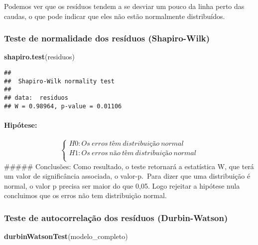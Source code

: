 \documentclass[
]{article}
\newenvironment{Shaded}{\begin{snugshade}}{\end{snugshade}}
\newcommand{\FunctionTok}[1]{\textcolor[rgb]{0.13,0.29,0.53}{\textbf{#1}}}
\newcommand{\NormalTok}[1]{#1}
\begin{document}
Podemos ver que os resíduos tendem a se desviar um pouco da linha perto
das caudas, o que pode indicar que eles não estão normalmente
distribuídos.

\hypertarget{teste-de-normalidade-dos-resuxedduos-shapiro-wilk}{%
\subsubsection{Teste de normalidade dos resíduos
(Shapiro-Wilk)}\label{teste-de-normalidade-dos-resuxedduos-shapiro-wilk}}

\begin{Shaded}
\begin{Highlighting}[]
\FunctionTok{shapiro.test}\NormalTok{(residuos)}
\end{Highlighting}
\end{Shaded}

\begin{verbatim}
## 
##  Shapiro-Wilk normality test
## 
## data:  residuos
## W = 0.98964, p-value = 0.01106
\end{verbatim}

\hypertarget{hipuxf3tese-5}{%
\paragraph{Hipótese:}\label{hipuxf3tese-5}}

\[
\left\{ \begin{array}{rc} 
H0: Os \ erros \ têm \ distribuição \ normal \\ 
H1: Os \ erros \ não \ têm \ distribuição \ normal \\ 
\end{array}\right.
\] \#\#\#\#\# Conclusões: Como resultado, o teste retornará a
estatística W, que terá um valor de significância associada, o
valor-p.~Para dizer que uma distribuição é normal, o valor p precisa ser
maior do que 0,05. Logo rejeitar a hipótese nula concluimos que os erros
não tem distribuição normal.

\hypertarget{teste-de-autocorrelauxe7uxe3o-dos-resuxedduos-durbin-watson}{%
\subsubsection{Teste de autocorrelação dos resíduos
(Durbin-Watson)}\label{teste-de-autocorrelauxe7uxe3o-dos-resuxedduos-durbin-watson}}

\begin{Shaded}
\begin{Highlighting}[]
\FunctionTok{durbinWatsonTest}\NormalTok{(modelo\_completo)}
\end{Highlighting}
\end{Shaded}
\end{document}

